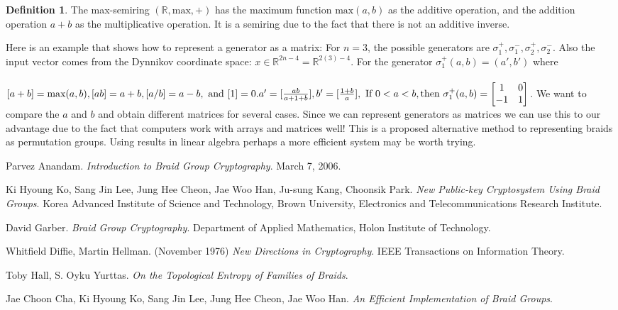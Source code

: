 \documentclass{article}
\theoremstyle{definition}
\newtheorem{definition}{Definition}[section]
\begin{document}
\begin{definition}
The max-semiring $(\mathbb{R},\text{max},+)$ has the maximum function $\text{max}(a,b)$ as the additive operation, and the addition operation $a+b$ as the multiplicative operation. It is a semiring due to the fact that there is not an additive inverse.
\end{definition}

\noindent Here is an example that shows how to represent a generator as a matrix: For $n=3$, the possible generators are $\sigma_1^+, \sigma_1^-, \sigma_2^+, \sigma_2^-$. Also the input vector comes from the Dynnikov coordinate space: $x \in \mathbb{R}^{2n-4} = \mathbb{R}^{2(3)-4}$. For the generator $\sigma_1^+ (a,b)=(a',b')$ where 
\\ \\
$[a+b]=\text{max}(a,b), [ab]=a+b, [a/b]=a-b, \text{ and } [1]=0. \\ \\ a'=[\frac{ab}{a+1+b}], b'=[\frac{1+b}{a}],   \\ \text{ If } 0<a<b , \text{then } \sigma_1^+ (a,b)=
\begin{bmatrix}
1 & 0\\
-1 & 1
\end{bmatrix} $. We want to compare the $a$ and $b$ and obtain different matrices for several cases. Since we can represent generators as matrices we can use this to our advantage due to the fact that computers work with arrays and matrices well! This is a proposed alternative method to representing braids as permutation groups. Using results in linear algebra perhaps a more efficient system may be worth trying. 


\begin{thebibliography}{9}

Parvez Anandam. 
\textit{Introduction to Braid Group Cryptography}. 
March 7, 2006.
 
Ki Hyoung Ko, Sang Jin Lee, Jung Hee Cheon, Jae Woo Han, Ju-sung Kang, Choonsik Park.
\textit{New Public-key Cryptosystem Using Braid Groups}.
Korea Advanced Institute of Science and Technology, Brown University, Electronics and Telecommunications Research Institute. 

David Garber.
\textit{Braid Group Cryptography}.
Department of Applied Mathematics, Holon Institute of Technology. 
 
Whitfield Diffie, Martin Hellman. (November 1976)
\textit{New Directions in Cryptography}.
IEEE Transactions on Information Theory.


Toby Hall, S. Oyku Yurttas.
\textit{On the Topological Entropy of Families of Braids}.

Jae Choon Cha, Ki Hyoung Ko, Sang Jin Lee, Jung Hee Cheon, Jae Woo Han.
\textit{An Efficient Implementation of Braid Groups}.


\end{thebibliography}






	
\end{document}
